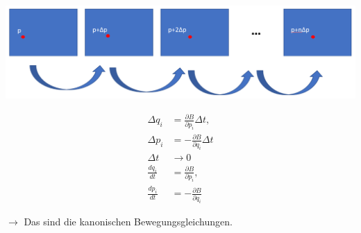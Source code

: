\begin{frame}
    \hspace*{-2.2cm}\includegraphics[scale=0.322]{images/TransFlow}
\end{frame}

\begin{frame}
    \begin{align*}
    \Delta q_i &= \frac{\partial B}{\partial p_i} \Delta t,\\
    \Delta p_i &= -\frac{\partial B}{\partial q_i} \Delta t \\[5mm]
      \Delta t &\longrightarrow 0 \\[5mm]
    \frac{dq_i}{dt}  &= \frac{\partial B}{\partial p_i},\\
    \frac{dp_i}{dt} &= -\frac{\partial B}{\partial q_i} 
    \end{align*}
    
    $\rightarrow$ Das sind die kanonischen Bewegungsgleichungen.

\end{frame}